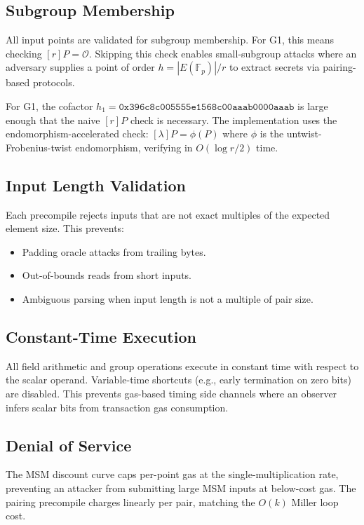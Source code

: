 \documentclass[11pt,a4paper]{article}
\begin{document}
\subsection{Subgroup Membership}

All input points are validated for subgroup membership. For G1, this means checking
$[r]P = \mathcal{O}$. Skipping this check enables small-subgroup attacks where an
adversary supplies a point of order $h = |E(\mathbb{F}_p)| / r$ to extract secrets
via pairing-based protocols.

For G1, the cofactor $h_1 = \texttt{0x396c8c005555e1568c00aaab0000aaab}$ is large
enough that the naive $[r]P$ check is necessary. The implementation uses the
endomorphism-accelerated check: $[\lambda]P = \phi(P)$ where $\phi$ is the
untwist-Frobenius-twist endomorphism, verifying in $O(\log r / 2)$ time.

\subsection{Input Length Validation}

Each precompile rejects inputs that are not exact multiples of the expected element
size. This prevents:
\begin{itemize}
  \item Padding oracle attacks from trailing bytes.
  \item Out-of-bounds reads from short inputs.
  \item Ambiguous parsing when input length is not a multiple of pair size.
\end{itemize}

\subsection{Constant-Time Execution}

All field arithmetic and group operations execute in constant time with respect to the
scalar operand. Variable-time shortcuts (e.g., early termination on zero bits) are
disabled. This prevents gas-based timing side channels where an observer infers
scalar bits from transaction gas consumption.

\subsection{Denial of Service}

The MSM discount curve caps per-point gas at the single-multiplication rate, preventing
an attacker from submitting large MSM inputs at below-cost gas. The pairing precompile
charges linearly per pair, matching the $O(k)$ Miller loop cost.
\end{document}
